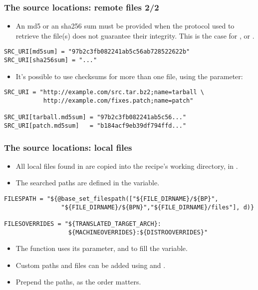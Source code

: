 \begin{frame}[fragile]
  \frametitle{The source locations: remote files 2/2}
  \begin{itemize}
    \item An md5 or an sha256 sum must be provided when the protocol
      used to retrieve the file(s) does not guarantee their integrity.
      This is the case for ,  or .
  \end{itemize}
  \begin{block}{}
    \begin{verbatim}
SRC_URI[md5sum] = "97b2c3fb082241ab5c56ab728522622b"
SRC_URI[sha256sum] = "..."
    \end{verbatim}
  \end{block}
  \begin{itemize}
    \item It's possible to use checksums for more than one file, using
      the  parameter:
  \end{itemize}
  \begin{block}{}
    \begin{verbatim}
SRC_URI = "http://example.com/src.tar.bz2;name=tarball \
           http://example.com/fixes.patch;name=patch"

SRC_URI[tarball.md5sum] = "97b2c3fb082241ab5c56..."
SRC_URI[patch.md5sum]   = "b184acf9eb39df794ffd..."
    \end{verbatim}
  \end{block}
\end{frame}

\begin{frame}[fragile]
  \frametitle{The source locations: local files}
  \begin{itemize}
    \item All local files found in  are copied into the
      recipe's working directory, in \code{$BUILDDIR/tmp/work/}.
    \item The searched paths are defined in the \code{FILESPATH}
      variable.
  \end{itemize}
  \begin{block}{}
  \begin{verbatim}
FILESPATH = "${@base_set_filespath(["${FILE_DIRNAME}/${BP}",
                "${FILE_DIRNAME}/${BPN}","${FILE_DIRNAME}/files"], d)}

FILESOVERRIDES = "${TRANSLATED_TARGET_ARCH}:
                  ${MACHINEOVERRIDES}:${DISTROOVERRIDES}"
  \end{verbatim}
  \end{block}
  \begin{itemize}
    \item The  function uses its
       parameter,   and
       to fill the  variable.
    \item Custom paths and files can be added using
       and .
    \item Prepend the paths, as the order matters.
  \end{itemize}
\end{frame}


